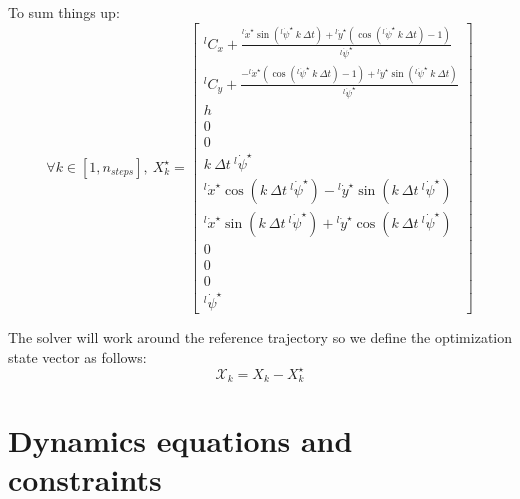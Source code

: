 \documentclass[a4paper,11pt]{article}
\begin{document}
To sum things up:
\begin{equation}
	\forall k \in [1, n_{steps}], ~ X_k^\star = \begin{bmatrix}
	{}^l\! C_x + \frac{{}^l\!\dot x^\star \sin({}^l\!\dot \psi^\star ~ k ~ \Delta t) + {}^l\!\dot y^\star \left( \cos({}^l\!\dot \psi^\star ~ k ~ \Delta t) - 1 \right)}{{}^l\!\dot \psi^\star} \\
	{}^l\! C_y + \frac{- {}^l\!\dot x^\star \left( \cos({}^l\!\dot \psi^\star ~ k ~ \Delta t) - 1 \right) + {}^l\!\dot y^\star \sin({}^l\!\dot \psi^\star ~ k ~ \Delta t)}{{}^l\!\dot \psi^\star} \\
	h \\ 0 \\ 0 \\ k ~ \Delta t ~  {}^l\! \dot \psi^\star \\
	{}^l\! \dot x^\star \cos(k ~ \Delta t ~  {}^l\! \dot \psi^\star) - {}^l\! \dot y^\star \sin(k ~ \Delta t ~  {}^l\! \dot \psi^\star) \\
	{}^l\! \dot x^\star \sin(k ~ \Delta t ~  {}^l\! \dot \psi^\star) + {}^l\! \dot y^\star \cos(k ~ \Delta t ~  {}^l\! \dot \psi^\star) \\ 0 \\ 0 \\ 0 \\ {}^l\! \dot \psi^\star
	\end{bmatrix}
\end{equation}



The solver will work around the reference trajectory so we define the optimization state vector as follows:
\begin{equation}\mathcal{X}_k = X_k - X_k^\star \end{equation}

\newpage
\section{Dynamics equations and constraints}
\end{document}
